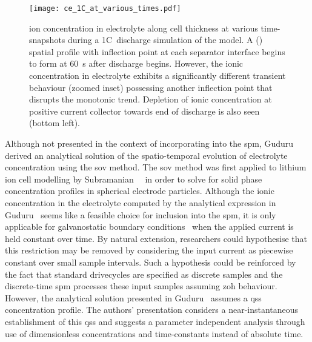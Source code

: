 \begin{figure}[!htbp]
    \centering
    \texttt{[image: ce\_1C\_at\_various\_times.pdf]}
    \caption[Electrolyte conc.\ (time-snapshots) along cell thickness for 1C~discharge]{ ion concentration in electrolyte along cell thickness
        at various time-snapshots during a 1C~discharge simulation of the
         model. A  () spatial
        profile  with inflection point at each separator interface begins to
        form at \approx \SI{60}{\second} after discharge begins. However, the
        ionic concentration in electrolyte exhibits a significantly different
        transient behaviour (zoomed inset) possessing another inflection point
        that disrupts the monotonic trend. Depletion of ionic concentration at
        positive current collector  towards end of discharge is also seen
    (bottom left).}
    \label{fig:ce1cdischgwithzoom}
\end{figure}

Although  not presented  in the  context  of incorporating  into the  \gls{spm},
Guduru~\etal~\cite{Guduru2012}   derived   an   analytical   solution   of   the
spatio-temporal  evolution  of  electrolyte concentration  using  the  \gls{sov}
method. The \gls{sov} method was first  applied to lithium ion cell modelling by
Subramanian~\etal~\cite{Subramanian2001a}  in order  to  solve  for solid  phase
concentration  profiles in  spherical  electrode particles.  Although the  ionic
concentration  in  the electrolyte  computed  by  the analytical  expression  in
Guduru~\etal{} seems like a feasible choice for inclusion into the \gls{spm}, it
is only applicable for galvanostatic  boundary conditions \ie~when the applied
current  is held  constant over  time. By  natural extension,  researchers could
hypothesise  that this  restriction  may  be removed  by  considering the  input
current as  piecewise constant  over small sample  intervals. Such  a hypothesis
could  be  reinforced  by  the  fact that  standard  drivecycles  are  specified
as  discrete  samples and  the  discrete-time  \gls{spm} processes  these  input
samples assuming \gls{zoh} behaviour. However, the analytical solution presented
in  Guduru~\etal{}  assumes  a  \gls{qss} concentration  profile.  The  authors'
presentation  considers a  near-instantaneous  establishment  of this  \gls{qss}
and  suggests a  parameter  independent analysis  through  use of  dimensionless
concentrations and time-constants instead of absolute time.

